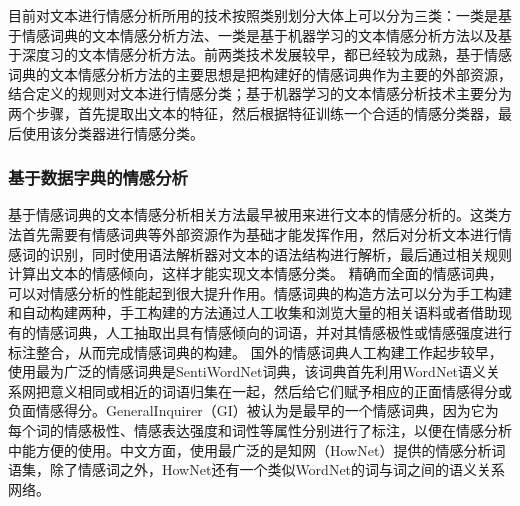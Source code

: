 \documentclass[cs4size,a4paper]{ctexart}
\numberwithin{equation}{section}
\numberwithin{table}{section}
\numberwithin{figure}{section}
\begin{document}
目前对文本进行情感分析所用的技术按照类别划分大体上可以分为三类：一类是基于情感词典的文本情感分析方法、一类是基于机器学习的文本情感分析方法以及基于深度习的文本情感分析方法。前两类技术发展较早，都已经较为成熟，基于情感词典的文本情感分析方法的主要思想是把构建好的情感词典作为主要的外部资源，结合定义的规则对文本进行情感分类；基于机器学习的文本情感分析技术主要分为两个步骤，首先提取出文本的特征，然后根据特征训练一个合适的情感分类器，最后使用该分类器进行情感分类。

\subsubsection{基于数据字典的情感分析}

基于情感词典的文本情感分析相关方法最早被用来进行文本的情感分析的。这类方法首先需要有情感词典等外部资源作为基础才能发挥作用，然后对分析文本进行情感词的识别，同时使用语法解析器对文本的语法结构进行解析，最后通过相关规则计算出文本的情感倾向，这样才能实现文本情感分类。
精确而全面的情感词典，可以对情感分析的性能起到很大提升作用。情感词典的构造方法可以分为手工构建和自动构建两种，手工构建的方法通过人工收集和浏览大量的相关语料或者借助现有的情感词典，人工抽取出具有情感倾向的词语，并对其情感极性或情感强度进行标注整合，从而完成情感词典的构建。
国外的情感词典人工构建工作起步较早，使用最为广泛的情感词典是SentiWordNet词典，该词典首先利用WordNet语义关系网把意义相同或相近的词语归集在一起，然后给它们赋予相应的正面情感得分或负面情感得分。GeneralInquirer（GI）被认为是最早的一个情感词典，因为它为每个词的情感极性、情感表达强度和词性等属性分别进行了标注，以便在情感分析中能方便的使用。中文方面，使用最广泛的是知网（HowNet）提供的情感分析词语集，除了情感词之外，HowNet还有一个类似WordNet的词与词之间的语义关系网络。
\end{document}
